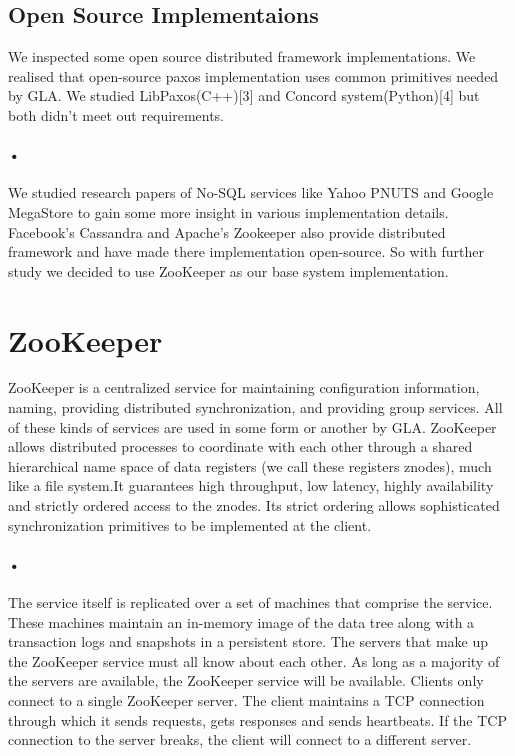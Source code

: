 \documentclass[a4paper,12pt]{report}
\begin{document}
\subsection{Open Source Implementaions}
We inspected some open source distributed framework implementations. We realised that open-source paxos implementation uses common primitives needed by GLA. We studied LibPaxos(C++)[3] and Concord system(Python)[4] but both didn't meet out requirements.
\paragraph{•}
We studied research papers of No-SQL services like Yahoo PNUTS and Google MegaStore to gain some more insight in various implementation details. Facebook's Cassandra and Apache's Zookeeper also provide distributed framework and have made there implementation open-source. So with further study we decided to use ZooKeeper as our base system implementation.

\section{ZooKeeper}
ZooKeeper is a centralized service for maintaining configuration information, naming, providing distributed synchronization, and providing group services. All of these kinds of services are used in some form or another by GLA. ZooKeeper allows distributed processes to coordinate with each other through a shared hierarchical name space of data registers (we call these registers znodes), much like a file system.It guarantees high throughput, low latency, highly availability and  strictly ordered access to the znodes. Its strict ordering allows sophisticated synchronization primitives to be implemented at the client.

\paragraph*{•}
The service itself is replicated over a set of machines that comprise the service. These machines maintain an in-memory image of the data tree along with a transaction logs and snapshots in a persistent store. The servers that make up the ZooKeeper service must all know about each other. As long as a majority of the servers are available, the ZooKeeper service will be available. Clients only connect to a single ZooKeeper server. The client maintains a TCP connection through which it sends requests, gets responses and sends heartbeats. If the TCP connection to the server breaks, the client will connect to a different server.
\end{document}
